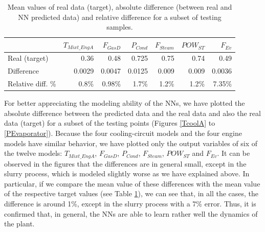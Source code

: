 \begin{table}[!t]
\caption{Mean values of  real data (target), absolute difference (between real and NN predicted data) and relative difference for a subset of testing samples.}
\label{tbl:diff}
  \centering
\begin{tabular}{lrrrrrr} \toprule
 & $T_{Mixt\_EngA}$ & $F_{GasD}$ & $P_{Cond}$ & $F_{Steam}$ & $POW_{ST}$ & $F_{Ev}$ \\ \midrule
Real (target) & 0.36 & 0.48 & 0.725 & 0.75 & 0.74 & 0.49 \\
Difference  & 0.0029 & 0.0047 & 0.0125 & 0.009 & 0.009 & 0.0036 \\
Relative diff. \%  & 0.8\%  & 0.98\% & 1.7\% & 1.2\% & 1.2\% & 7.35\%\\
 \bottomrule
\end{tabular}
\vspace{-0.3cm}

\end{table}

For better appreciating the modeling ability of the NNs, we have  plotted the absolute difference between the predicted data and the real data and also the real data (target) for a subset of the testing points (Figures \ref{TcoolA} to \ref{PEvaporator}). Because the four cooling-circuit models and the four engine models have similar behavior, we have plotted only the output variables of six of the twelve models: $T_{Mixt\_EngA}$, $F_{GasD}$, $P_{Cond}$, $F_{Steam}$, $POW_{ST}$ and $F_{Ev}$.  It can be observed in the figures that the differences are in general small, except in the slurry process,  which is modeled slightly worse as we have  explained above.  In particular, if we compare the mean value of these differences with the mean value of the respective target values (see Table \ref{tbl:diff}), we can see that, in all the cases, the difference is around 1\%, except in the slurry process with a 7\% error. Thus, it is confirmed that, in general, the NNs are able to learn rather well the dynamics of the plant. 




